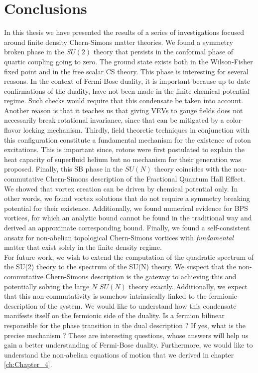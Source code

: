 
\chapter*{Conclusions}

    In this thesis we have presented the results of a series of investigations focused around finite density Chern-Simons matter theories. We found a symmetry broken phase in the $SU(2)$ theory that persists in the conformal phase of quartic coupling going to zero. The ground state exists both in the Wilson-Fisher fixed point and in the free scalar CS theory. This phase is interesting for several reasons. In the context of Fermi-Bose duality, it is important because up to date confirmations of the duality, have not been made in the finite chemical potential regime. Such checks would require that this condensate be taken into account. Another reason is that it teaches us that giving VEVs to gauge fields does not necessarily break rotational invariance, since that can be mitigated by a color-flavor locking mechanism. Thirdly, field theoretic techniques in conjunction with this configuration constitute a fundamental mechanism for the existence of roton excitations. This is important since, rotons were first postulated to explain the heat capacity of superfluid helium but no mechanism for their generation was proposed. Finally, this SB phase in the $SU(N)$ theory coincides with the non-commutative Chern-Simons description of the Fractional Quantum Hall Effect.\\
    \indent We showed that vortex creation can be driven by chemical potential only. In other words, we found vortex solutions that do not require a symmetry breaking potential for their existence. Additionally, we found numerical evidence for BPS vortices, for which an analytic bound cannot be found in the traditional way and derived an approximate corresponding bound. Finally, we found a self-consistent ansatz for non-abelian topological Chern-Simons vortices with \textit{fundamental} matter that exist solely in the finite density regime.\\
    \indent For future work, we wish to extend the computation of the quadratic spectrum of the SU(2) theory to the spectrum of the SU(N) theory. We suspect that the non-commutative Chern-Simons description is the gateway to achieving this and potentially solving the large $N$ $SU(N)$ theory exactly. Additionally, we expect that this non-commutativity is somehow intrinsically linked to the fermionic description of the system. We would like to understand how this condensate manifests itself on the fermionic side of the duality. Is a fermion bilinear responsible for the phase transition in the dual description ? If yes, what is the precise mechanism ? These are interesting questions, whose answers will help us gain a better understanding of Fermi-Bose duality. Furthermore, we would like to understand the non-abelian equations of motion that we derived in chapter \ref{ch:Chapter_4}.\\

